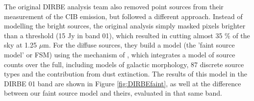 \documentclass{aa}
\begin{document}
The original DIRBE analysis team \citep{dirbeFaint} also removed point sources from their measurement of the CIB emission, but followed a different approach. Instead of modelling the bright sources, the original analysis simply masked pixels brighter than a threshold (15 Jy in band 01), which resulted in cutting almost 35 \% of the sky at 1.25 $\mu$m. For the diffuse sources, they build a model (the 'faint source model' or FSM) using the mechanism of \cite{wainscoat}, which integrates a model of source counts over the full, including models of galactic morphology, 87 discrete source types and the contribution from dust extinction. The results of this model in the DIRBE 01 band are shown in Figure \ref{fig:DIRBEfaint}, as well at the difference between our faint source model and theirs, evaluated in that same band. 
\end{document}
